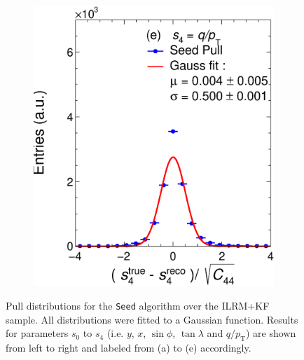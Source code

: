\begin{figure}[t]
\begin{subfigure}{0.32\textwidth}
         \includegraphics[width=\textwidth]{figures/ch4-KF_NDGArLite/MC/ILRM+KF/UnitSeed_p4.eps}
         \caption{}
         \label{fig:resp4Seed_GArLite_ILRM+KF}
     \end{subfigure}
        \caption{Pull distributions for the \texttt{Seed} algorithm over the ILRM+KF sample. All distributions were fitted to a Gaussian function. Results for parameters $s_0$ to $s_4$ (i.e. $y$, $x$, $\sin\phi$, $\tan\lambda$ and $q/p_{\text{T}}$) are shown from left to right and labeled from (a) to (e) accordingly. }
        \label{fig:MCUnitSeed_GArLite_ILRM+KF}
\end{figure}

